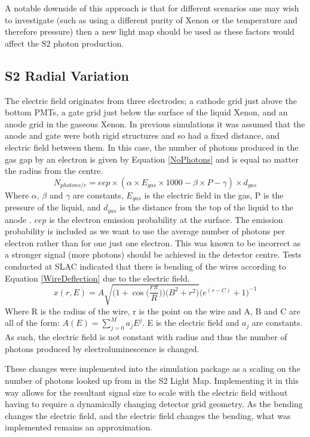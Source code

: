 \par
A notable downside of this approach is that for different scenarios one may wish to investigate (such as using a different purity of Xenon or the temperature and therefore pressure) then a new light map should be used as these factors would affect the S2 photon production.



\subsection{S2 Radial Variation} \label{S2RadialVariation}
\par
The electric field originates from three electrodes; a cathode grid just above the bottom PMTs, a gate grid just below the surface of the liquid Xenon, and an anode grid in the gaseous Xenon.
In previous simulations it was assumed that the anode and gate were both rigid structures and so had a fixed distance, and electric field between them.
In this case, the number of photons produced in the gas gap by an electron is given by Equation \ref{NoPhotons} and is equal no matter the radius from the centre. 
\begin{equation}
    N_{photons/e} = eep \times (\alpha \times E_{gas} \times 1000 - \beta \times P - \gamma) \times d_{gas}
    \label{NoPhotons}
\end{equation}
Where $\alpha$, $\beta$ and $\gamma$ are constants, $E_{gas}$ is the electric field in the gas, P is the pressure of the liquid, and $d_{gas}$ is the distance from the top of the liquid to the anode \cite{NoPhotonsPerElectron}.
$eep$ is the electron emission probability at the surface.
The emission probability is included as we want to use the average number of photons per electron rather than for one just one electron.
This was known to be incorrect as a stronger signal (more photons) should be achieved in the detector centre.
Tests conducted at SLAC indicated that there is bending of the wires according to Equation \ref{WireDeflection} due to the electric field.
\begin{equation}
    x(r,E) = A \sqrt{ \bigg( 1 + \cos{ \Big( \frac{r \pi}{R} } \Big) \bigg) \bigg( B^2 + r^2 \bigg) } \bigg( e^{(r-C)} + 1 \bigg)^{-1} 
    \label{WireDeflection}
\end{equation}
Where R is the radius of the wire, r is the point on the wire and A, B and C are all of the form: $A(E) = \sum_{j=0}^{M} a_{j} E^{j}$. E is the electric field and $a_{j}$ are constants.
As such, the electric field is not constant with radius and thus the number of photons produced by electroluminescence is changed.
\par
These changes were implemented into the simulation package as a scaling on the number of photons looked up from in the S2 Light Map.
Implementing it in this way allows for the resultant signal size to scale with the electric field without having to require a dynamically changing detector grid geometry.
As the bending changes the electric field, and the electric field changes the bending, what was implemented remains an approximation.
